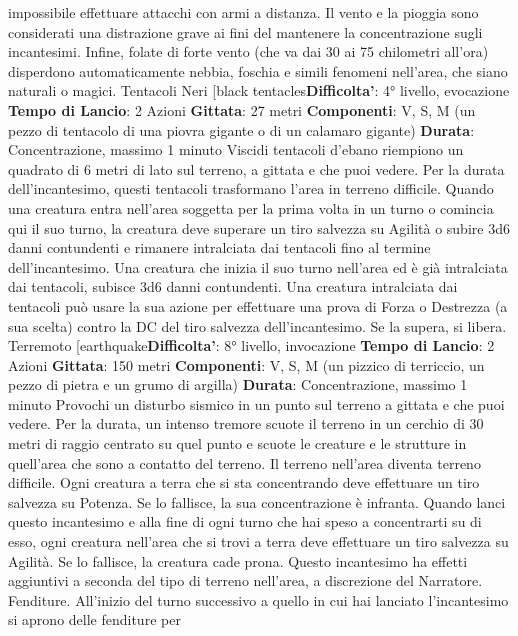 \begin{multicols}{2}
impossibile effettuare attacchi con armi a distanza. Il
vento e la pioggia sono considerati una distrazione
grave ai fini del mantenere la concentrazione sugli
incantesimi. Infine, folate di forte vento (che va dai 30 ai
75 chilometri all’ora) disperdono automaticamente
nebbia, foschia e simili fenomeni nell’area, che siano
naturali o magici.
Tentacoli Neri
[black tentacles\textbf{Difficolta'}:
4° livello, evocazione
\textbf{Tempo di Lancio}: 2 Azioni
\textbf{Gittata}: 27 metri
\textbf{Componenti}: V, S, M (un pezzo di tentacolo di una
piovra gigante o di un calamaro gigante)
\textbf{Durata}: Concentrazione, massimo 1 minuto
Viscidi tentacoli d’ebano riempiono un quadrato di 6
metri di lato sul terreno, a gittata e che puoi vedere. Per
la durata dell’incantesimo, questi tentacoli trasformano
l’area in terreno difficile.
Quando una creatura entra nell’area soggetta per la
prima volta in un turno o comincia qui il suo turno, la
creatura deve superare un tiro salvezza su Agilità o
subire 3d6 danni contundenti e rimanere intralciata dai
tentacoli fino al termine dell’incantesimo. Una creatura
che inizia il suo turno nell’area ed è già intralciata dai
tentacoli, subisce 3d6 danni contundenti.
Una creatura intralciata dai tentacoli può usare la sua
azione per effettuare una prova di Forza o Destrezza (a
sua scelta) contro la DC del tiro salvezza
dell’incantesimo. Se la supera, si libera.
Terremoto
[earthquake\textbf{Difficolta'}:
8° livello, invocazione
\textbf{Tempo di Lancio}: 2 Azioni
\textbf{Gittata}: 150 metri
\textbf{Componenti}: V, S, M (un pizzico di terriccio, un pezzo
di pietra e un grumo di argilla)
\textbf{Durata}: Concentrazione, massimo 1 minuto
Provochi un disturbo sismico in un punto sul terreno a
gittata e che puoi vedere. Per la durata, un intenso
tremore scuote il terreno in un cerchio di 30 metri di
raggio centrato su quel punto e scuote le creature e le
strutture in quell’area che sono a contatto del terreno.
Il terreno nell’area diventa terreno difficile. Ogni
creatura a terra che si sta concentrando deve effettuare
un tiro salvezza su Potenza. Se lo fallisce, la sua
concentrazione è infranta.
Quando lanci questo incantesimo e alla fine di ogni
turno che hai speso a concentrarti su di esso, ogni
creatura nell’area che si trovi a terra deve effettuare un
tiro salvezza su Agilità. Se lo fallisce, la creatura
cade prona.
Questo incantesimo ha effetti aggiuntivi a seconda del
tipo di terreno nell’area, a discrezione del Narratore.
Fenditure. All’inizio del turno successivo a quello in cui
hai lanciato l’incantesimo si aprono delle fenditure per

\end{multicols}
